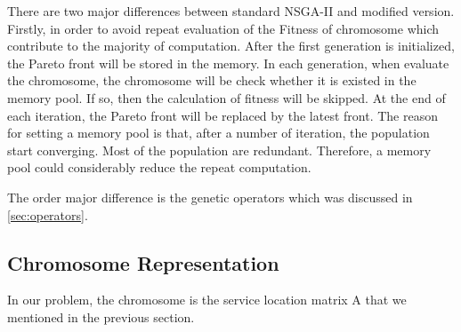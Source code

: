 \documentclass[twoside]{article}
\begin{document}
There are two major differences between standard NSGA-II and modified version. Firstly, in order to avoid repeat evaluation of the Fitness
of chromosome which contribute to the majority of computation. After the first generation is initialized, the Pareto front will be 
stored in the memory. In each generation, when evaluate the chromosome, the chromosome will be check whether it is existed in the memory pool. 
If so, then the calculation of fitness will be skipped. At the end of each iteration, the Pareto front will be replaced by the latest front.
The reason for setting a memory pool is that, after a number of iteration, the population start converging. 
Most of the population are redundant. Therefore, a memory pool could considerably reduce the repeat computation.

The order major difference is the genetic operators which was discussed in \ref{sec:operators}.

\subsection{Chromosome Representation}
In our problem, the chromosome is the service location matrix A that we mentioned in the previous section. 
\end{document}
